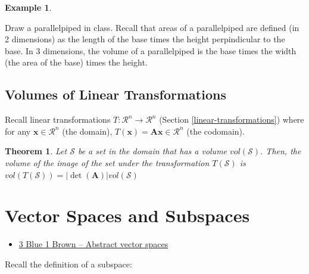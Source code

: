 \documentclass[
]{book}
\providecommand{\tightlist}{%
  \setlength{\itemsep}{0pt}\setlength{\parskip}{0pt}}
\newtheorem{theorem}{Theorem}[chapter]
\theoremstyle{definition}
\theoremstyle{definition}
\newtheorem{example}{Example}[chapter]
\theoremstyle{definition}
\theoremstyle{remark}
\begin{document}
\begin{example}
\protect\hypertarget{exm:unlabeled-div-115}{}\label{exm:unlabeled-div-115}

Draw a parallelpiped in class. Recall that areas of a parallelpiped are defined (in 2 dimensions) as the length of the base times the height perpindicular to the base. In 3 dimensions, the volume of a parallelpiped is the base times the width (the area of the base) times the height.

\end{example}

\hypertarget{volumes-of-linear-transformations}{%
\section{Volumes of Linear Transformations}\label{volumes-of-linear-transformations}}

Recall linear transformations \(T:\mathcal{R}^n \rightarrow \mathcal{R}^n\) (Section \ref{linear-transformations}) where for any \(\mathbf{x} \in \mathcal{R}^n\) (the domain), \(T(\mathbf{x}) = \mathbf{A} \mathbf{x} \in \mathcal{R}^n\) (the codomain).

\begin{theorem}
\protect\hypertarget{thm:unnamed-chunk-223}{}{\label{thm:unnamed-chunk-223} }Let \(\mathcal{S}\) be a set in the domain that has a volume \(vol(\mathcal{S})\). Then, the volume of the image of the set under the transformation \(T(\mathcal{S})\) is \(vol(T(\mathcal{S})) = |\det(\mathbf{A})|vol(\mathcal{S})\)
\end{theorem}

\hypertarget{vector-spaces-and-subspaces}{%
\chapter{Vector Spaces and Subspaces}\label{vector-spaces-and-subspaces}}

\begin{itemize}
\tightlist
\item
  \href{https://www.3blue1brown.com/lessons/abstract-vector-spaces}{3 Blue 1 Brown -- Abstract vector spaces}
\end{itemize}

Recall the definition of a subspace:
\end{document}
